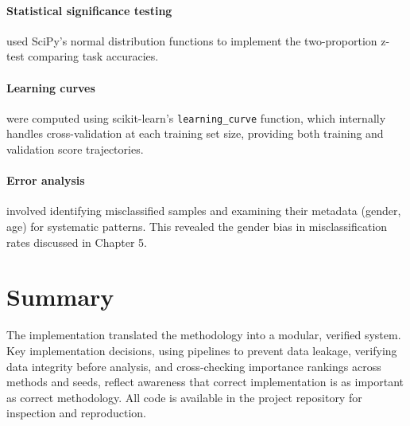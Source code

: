\paragraph{Statistical significance testing} used SciPy's normal distribution functions to implement the two-proportion z-test comparing task accuracies.

\paragraph{Learning curves} were computed using scikit-learn's \texttt{learning\_curve} function, which internally handles cross-validation at each training set size, providing both training and validation score trajectories.

\paragraph{Error analysis} involved identifying misclassified samples and examining their metadata (gender, age) for systematic patterns. This revealed the gender bias in misclassification rates discussed in Chapter 5.

\section{Summary}

The implementation translated the methodology into a modular, verified system. Key implementation decisions, using pipelines to prevent data leakage, verifying data integrity before analysis, and cross-checking importance rankings across methods and seeds, reflect awareness that correct implementation is as important as correct methodology. All code is available in the project repository for inspection and reproduction.
